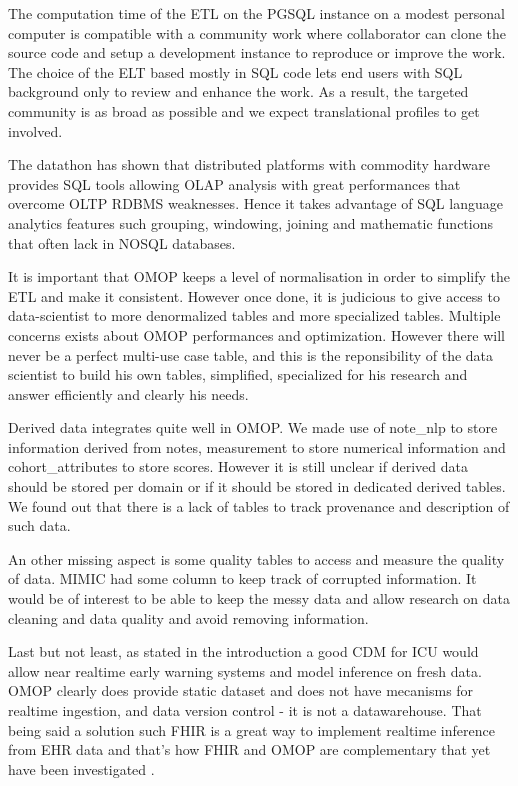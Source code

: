 The computation time of the ETL on the PGSQL instance on a modest personal
computer is compatible with a community work where collaborator can clone the
source code and setup a development instance to reproduce or improve the work.
The choice of the ELT based mostly in SQL code lets end users with SQL
background only to review and enhance the work. As a result, the targeted
community is as broad as possible and we expect translational profiles to get
involved.

The datathon has shown that distributed platforms with commodity hardware
provides SQL tools allowing OLAP analysis with great performances that overcome
OLTP RDBMS weaknesses. Hence it takes advantage of SQL language analytics
features such grouping, windowing, joining and mathematic functions that often
lack in NOSQL databases.

It is important that OMOP keeps a level of normalisation in order to simplify
the ETL and make it consistent. However once done, it is judicious to give
access to data-scientist to more denormalized tables and more specialized
tables. Multiple concerns exists about OMOP performances and optimization.
However there will never be a perfect multi-use case table, and this is the
reponsibility of the data scientist to build his own tables, simplified,
specialized for his research and answer efficiently and clearly his needs.

Derived data integrates quite well in OMOP. We made use of note\_nlp to store
information derived from notes, measurement to store numerical information and
cohort\_attributes to store scores. However it is still unclear if derived data
should be stored per domain or if it should be stored in dedicated derived
tables. We found out that there is a lack of tables to track provenance and
description of such data.

An other missing aspect is some quality tables to access and measure the
quality of data. MIMIC had some column to keep track of corrupted information.
It would be of interest to be able to keep the messy data and allow research on
data cleaning and data quality and avoid removing information.

Last but not least, as stated in the introduction a good CDM for ICU would
allow near realtime early warning systems and model inference on fresh data.
OMOP clearly does provide static dataset and does not have mecanisms for
realtime ingestion, and data version control - it is not a datawarehouse. That
being said a solution such FHIR is a great way to implement realtime inference
from EHR data and that's how FHIR and OMOP are complementary that yet have been
investigated \cite{gatech}.

